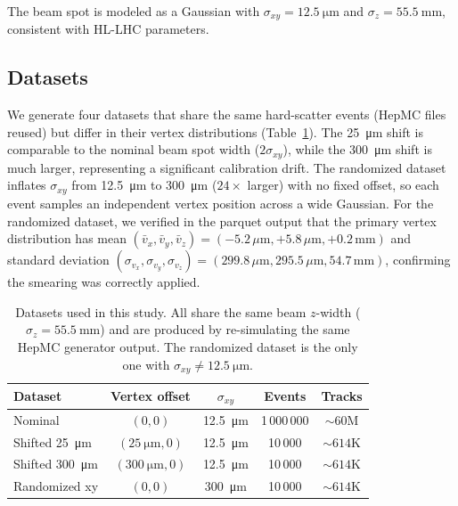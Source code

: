 \documentclass[11pt]{article}
\begin{document}
The beam spot is modeled as a Gaussian with $\sigma_{xy} = \SI{12.5}{\micro\metre}$ and $\sigma_z = \SI{55.5}{\milli\metre}$, consistent with HL-LHC parameters.

\subsection{Datasets}

We generate four datasets that share the same hard-scatter events (HepMC files reused) but differ in their vertex distributions (Table~\ref{tab:datasets}).
The \SI{25}{\micro\metre} shift is comparable to the nominal beam spot width ($2\sigma_{xy}$), while the \SI{300}{\micro\metre} shift is much larger, representing a significant calibration drift.
The randomized dataset inflates $\sigma_{xy}$ from \SI{12.5}{\micro\metre} to \SI{300}{\micro\metre} ($24\times$ larger) with no fixed offset, so each event samples an independent vertex position across a wide Gaussian.
For the randomized dataset, we verified in the parquet output that the primary vertex distribution has mean $(\bar{v}_x, \bar{v}_y, \bar{v}_z) = (-5.2\,\mu\text{m}, +5.8\,\mu\text{m}, +0.2\,\text{mm})$ and standard deviation $(\sigma_{v_x}, \sigma_{v_y}, \sigma_{v_z}) = (299.8\,\mu\text{m}, 295.5\,\mu\text{m}, 54.7\,\text{mm})$, confirming the smearing was correctly applied.

\begin{table}[h]
\centering
\caption{Datasets used in this study. All share the same beam $z$-width ($\sigma_z = \SI{55.5}{\milli\metre}$) and are produced by re-simulating the same HepMC generator output. The randomized dataset is the only one with $\sigma_{xy} \neq \SI{12.5}{\micro\metre}$.}
\label{tab:datasets}
\begin{tabular}{lcccc}
\toprule
Dataset & Vertex offset & $\sigma_{xy}$ & Events & Tracks \\
\midrule
Nominal & $(0, 0)$ & \SI{12.5}{\micro\metre} & 1\,000\,000 & ${\sim}60$M \\
Shifted \SI{25}{\micro\metre} & $(\SI{25}{\micro\metre}, 0)$ & \SI{12.5}{\micro\metre} & 10\,000 & ${\sim}614$K \\
Shifted \SI{300}{\micro\metre} & $(\SI{300}{\micro\metre}, 0)$ & \SI{12.5}{\micro\metre} & 10\,000 & ${\sim}614$K \\
Randomized xy & $(0, 0)$ & \SI{300}{\micro\metre} & 10\,000 & ${\sim}614$K \\
\bottomrule
\end{tabular}
\end{table}
\end{document}
